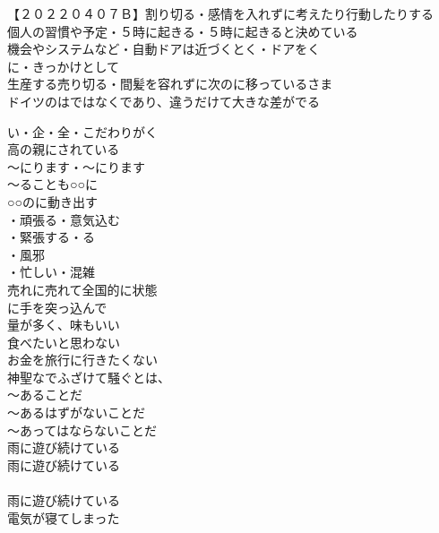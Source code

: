 【２０２２０４０７Ｂ】割り切る・感情を入れずに考えたり行動したりする\\

個人の習慣や予定・５時に起きる・５時に起きると決めている\\
機会やシステムなど・自動ドアは近づくとく・ドアをく\\

に・きっかけとして\\
生産する売り切る・間髪を容れずに次のに移っているさま\\

ドイツのはではなくであり、違うだけて大きな差がでる\\

\begin{multicols}{2}

い・企・全・こだわりがく\\
高の親にされている\\
〜にります・〜にります\\
〜ることも○○に\\
○○のに動き出す\\
・頑張る・意気込む\\
・緊張する・る\\
・風邪\\
・忙しい・混雑\\
売れに売れて全国的に状態\\
に手を突っ込んで\\

量が多く、味もいい\\
食べたいと思わない\\
お金を旅行に行きたくない\\

神聖なでふざけて騒ぐとは、\\
〜あることだ\\
〜あるはずがないことだ\\
〜あってはならないことだ\\
雨に遊び続けている\\
雨に遊び続けている\\
\\
雨に遊び続けている\\
電気が寝てしまった\\

\end{multicols}

